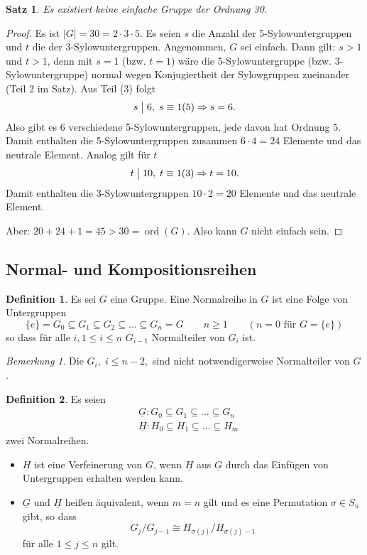 \documentclass[12pt]{scrartcl} %
\DeclareMathOperator{\ord}{ord}
\newcommand{\divides}{\bigm|}
\newtheorem{thm}{Satz}
\theoremstyle{definition}
\newtheorem*{defn}{Definition}
\theoremstyle{remark}
\newtheorem*{nb}{Bemerkung}
\begin{document}
\begin{thm}
	Es existiert keine einfache Gruppe der Ordnung 30.
\end{thm}

\begin{proof}
	Es ist $|G| = 30 = 2\cdot 3\cdot 5$. Es seien $s$ die Anzahl der 5-Sylowuntergruppen und $t$ die der 3-Sylowuntergruppen. Angenommen, $G$ sei einfach. Dann gilt: $s>1$ und $t>1$, denn mit $s=1$ (bzw. $t=1$) wäre die 5-Sylowuntergruppe (bzw. 3-Sylowuntergruppe) normal wegen Konjugiertheit der Sylowgruppen zueinander (Teil 2 im Satz). Aus Teil (3) folgt
		\[ s \divides 6,\; s\equiv 1(5)\Rightarrow s=6.\]
	Also gibt es 6 verschiedene 5-Sylowuntergruppen, jede davon hat Ordnung $5$. Damit enthalten die 5-Sylowuntergruppen zusammen $6\cdot 4 =24$ Elemente und das neutrale Element. Analog gilt für $t$
		\[ t \divides 10,\; t\equiv 1(3) \Rightarrow t=10.\]
	Damit enthalten die 3-Sylowuntergruppen $10\cdot 2=20$ Elemente und das neutrale Element.
	
	Aber: $20+24+1=45>30=\ord(G)$. Also kann $G$ nicht einfach sein.
\end{proof}

\subsection{Normal- und Kompositionsreihen}

\begin{defn}
	Es sei $G$ eine Gruppe. Eine Normalreihe in $G$ ist eine Folge von Untergruppen
		\[ \{e\} = G_0 \subseteq G_1 \subseteq G_2 \subseteq\dots\subseteq G_n=G\qquad n\geq 1\qquad(n=0\text{ für } G=\{e\})\]
	so dass für alle $i,1\leq i\leq n$ $G_{i-1}$ Normalteiler von $G_i$ ist.
\end{defn}

\begin{nb}
	Die $G_i,\;i\leq n-2,$ sind nicht notwendigerweise Normalteiler von $G$.
\end{nb}

\begin{defn}
	Es seien 
		\[\begin{split}
			&\underline{G}: G_0\subseteq G_1 \subseteq\dots\subseteq G_n \\
			&\underline{H}: H_0\subseteq H_1\subseteq\dots\subseteq H_m 
		\end{split}\]
	zwei Normalreihen.
	\begin{itemize}
		\item $\underline{H}$ ist eine Verfeinerung von $\underline{G}$, wenn $\underline{H}$ aus $\underline{G}$ durch das Einfügen von Untergruppen erhalten werden kann.
		\item $\underline{G}$ und $\underline{H}$ heißen äquivalent, wenn $m=n$ gilt und es eine Permutation $\sigma\in S_n$ gibt, so dass 
		\[ G_j/G_{j-1}\cong H_{\sigma(j)}/H_{\sigma(j)-1}\]
			für alle $1\leq j\leq n$ gilt.
	\end{itemize}
\end{defn}
\end{document}
